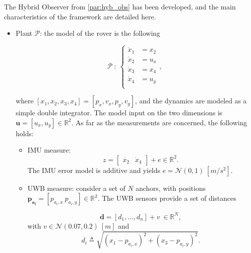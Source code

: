 
The Hybrid Observer from \cref{par:hyb_obs} has been developed, and the main characteristics of the framework are detailed here. 

\begin{itemize}
    \item Plant $\mathcal{P}$: the model of the rover is the following

    \begin{equation}
        \label{eqn:P_rover}
        \mathcal{P} \ : \ 
        \begin{cases}
            \dot{x}_1 &= x_2 \\
            \dot{x}_2 &= u_x \\    
            \dot{x}_3 &= x_4 \\
            \dot{x}_4 &= u_y \\                        
        \end{cases},
    \end{equation}
    
    where $[x_1,x_2,x_3,x_4] = [p_x,v_x,p_y,v_y]$, and the dynamics are modeled as a simple double integrator. The model input on the two dimensions is $\bm{u} = [u_x,u_y] \in \mathbb{R}^2$. As far as the measurements are concerned, the following holds: 

    \begin{itemize}
        \item IMU measure: 
        \begin{equation}
            \label{eqn:IMU}
            z = 
            \begin{bmatrix}
                \dot{x_2} & \dot{x}_4
            \end{bmatrix}
            + e \in \mathbb{R}^2.
        \end{equation} 
        The IMU error model is additive and yields $e = \mathcal{N}(0,1) \ [m/s^2]$.
        \item UWB measure: consider a set of $N$ anchors, with positions $\bm{p_{a_i}} = [p_{a_i,x} \ p_{a_i,y}] \in \mathbb{R}^2$. The UWB sensors provide a set of distances 

        \begin{equation}
            \label{eqn:UWB_meas}
            \bm{d} = [d_1,\dots,d_n] + v \ \in\mathbb{R}^N,
        \end{equation}        
        with $v \in \mathcal{N}(0.07,0.2) \ [m]$ and
        \begin{equation}
            \label{eqn:UWB_dist_def}
            d_i \triangleq \sqrt{(x_1-p_{a_i,x})^2 + (x_3-p_{a_i,y})^2}.
        \end{equation}        
    \end{itemize}
\end{itemize}